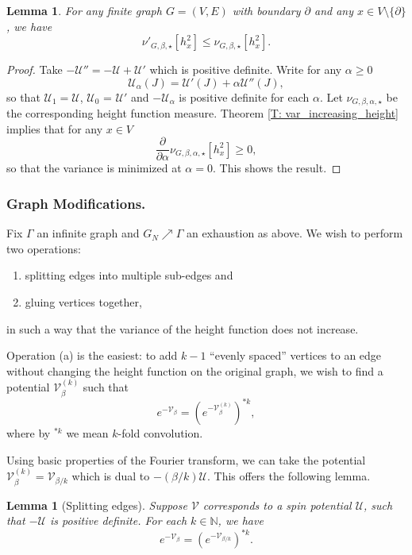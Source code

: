 \documentclass[11pt, reqno]{amsart}
\newtheorem{lemma}[theorem]{Lemma}
\numberwithin{equation}{section}
\theoremstyle{definition}
\theoremstyle{remark}
\newcommand{\NN}{\mathbb{N}}
\renewcommand{\c}[1]{\ensuremath{\mathcal{#1}}}
\newcommand{\J}{J}
\newcommand{\exact}{\star}
\begin{document}
\begin{lemma} \label{L: pure-pot reduction}
	For any finite graph $G = (V, E)$ with boundary $\partial$ and any $x \in V \setminus \{\partial\}$, we have
	\[	
		\nu'_{G, \beta, \exact}[h_x^2] \leq \nu_{G, \beta, \exact}[h_x^2].
	\]
\end{lemma}
\begin{proof}
	Take $-\c{U}'' = -\c{U} + \c{U}'$ which is positive definite. 
	Write for any $\alpha \geq 0$ 
	\[
		\c{U}_{\alpha}(\J) = \c{U}'(\J) + \alpha\c{U''}(\J), 
	\]
	so that $\c{U}_1 = \c{U}$, $\c{U}_0$ = $\c{U}'$ and $-\c{U}_{\alpha}$ is positive definite for each $\alpha$. 
	 Let $\nu_{G, \beta, \alpha, \exact}$ be  the corresponding height function measure. 
	 Theorem \ref{T: var_increasing_height} implies that for any $x \in V$
	 \[
	 	\frac{\partial}{\partial \alpha} \nu_{G, \beta, \alpha, \exact}[h_x^2] \geq 0,
	 \]
	 so that the variance is minimized at $\alpha = 0$. This shows the result. 
\end{proof}

\subsubsection{Graph Modifications.} \label{sec: graph mod}
Fix $\Gamma$ an infinite graph and $G_N \nearrow \Gamma$ an exhaustion as above.   
We wish to perform two operations:
\begin{enumerate}[\hspace{1cm}(a)]
	\item splitting edges into multiple sub-edges and
	\item gluing vertices together, 
\end{enumerate}
in such a way that the variance of the height function does not increase. 

Operation (a) is the easiest: to add $k - 1$ ``evenly spaced'' vertices to an edge without changing the height function on the original graph, 
we wish to find a potential $\c{V}_{\beta}^{(k)}$ such that 
\[
	e^{-\c{V}_{\beta}} = (e^{-\c{V}_{\beta}^{(k)}})^{*k},
\]
where by $^{*k}$ we mean $k$-fold convolution. 

Using basic properties of the Fourier transform, we can take the potential $\c{V}_{\beta}^{(k)} = \c{V}_{\beta / k}$ which is dual to $-(\beta / k)\c{U}$.  
This offers the following lemma. 

\begin{lemma}[Splitting edges] \label{L: splitting edges}
	Suppose $\c{V}$ corresponds to a spin potential $\c{U}$, such that $-\c{U}$ is positive definite.  
	For each $k \in \NN$, we have
	\[
		e^{-\c{V}_{\beta}} = (e^{-\c{V}_{\beta / k} })^{*k}.
	\]
\end{lemma}
\end{document}
